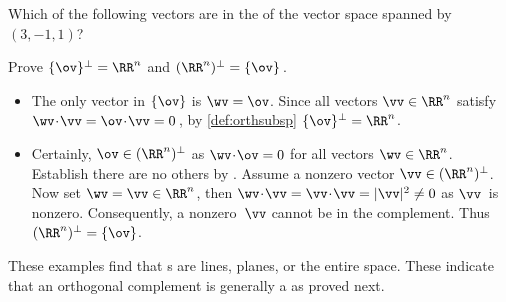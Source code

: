 \begin{reduce}
\begin{activity}
Which of the following vectors are in the  of the vector space spanned by~\((3,-1,1)\)?
\end{activity}



\begin{example} 
Prove \(\{\ov\}^\perp=\RR^n\) and \((\RR^n)^\perp=\{\ov\}\)\,.
\begin{solution} 
\begin{itemize}
\item The only vector in \(\{\ov\}\) is \(\wv=\ov\).
Since all vectors \(\vv\in\RR^n\) satisfy \(\wv\cdot\vv=\ov\cdot\vv=0\)\,, by \cref{def:orthsubsp} \(\{\ov\}^\perp=\RR^n\).

\item Certainly, \(\ov\in(\RR^n)^\perp\) as \(\wv\cdot\ov=0\) for all vectors \(\wv\in\RR^n\).
Establish there are no others by .
Assume a nonzero vector \(\vv\in(\RR^n)^\perp\).
Now set \(\wv=\vv\in\RR^n\), then \(\wv\cdot\vv=\vv\cdot\vv=|\vv|^2\neq0\) as \(\vv\)~is nonzero.
Consequently, a nonzero~\(\vv\) cannot be in the complement.
Thus \((\RR^n)^\perp=\{\ov\}\).
\end{itemize}
\end{solution}
\end{example}




%
%
%

These examples find that s are lines, planes, or the entire space.  
These indicate that an orthogonal complement is generally a  as proved next.


\end{reduce}
